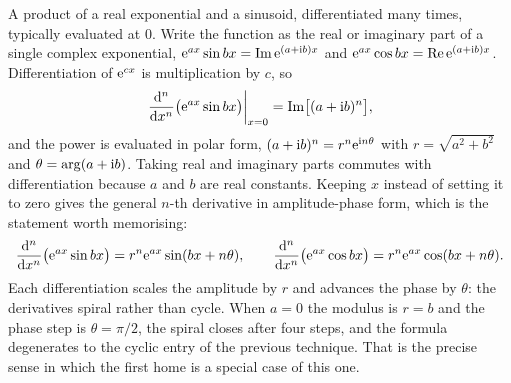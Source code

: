 \cue A product of a real exponential and a sinusoid, differentiated many times, typically evaluated at $0$.
\method Write the function as the real or imaginary part of a single complex exponential, $\mathrm{e}^{ax}\sin bx=\operatorname{Im}\mathrm{e}^{(a+\mathrm{i} b)x}$ and $\mathrm{e}^{ax}\cos bx=\operatorname{Re}\mathrm{e}^{(a+\mathrm{i} b)x}$. Differentiation of $\mathrm{e}^{cx}$ is multiplication by $c$, so
\[
\left.\frac{\mathrm{d}^{n}}{\mathrm{d}x^{n}}\bigl(\mathrm{e}^{ax}\sin bx\bigr)\right|_{x=0}=\operatorname{Im}\bigl[(a+\mathrm{i} b)^{n}\bigr],
\]
and the power is evaluated in polar form, $(a+\mathrm{i} b)^{n}=r^{n}\mathrm{e}^{\mathrm{i} n\theta}$ with $r=\sqrt{a^{2}+b^{2}}$ and $\theta=\arg(a+\mathrm{i} b)$. Taking real and imaginary parts commutes with differentiation because $a$ and $b$ are real constants. Keeping $x$ instead of setting it to zero gives the general $n$-th derivative in amplitude-phase form, which is the statement worth memorising:
\[
\frac{\mathrm{d}^{n}}{\mathrm{d}x^{n}}\bigl(\mathrm{e}^{ax}\sin bx\bigr)=r^{n}\mathrm{e}^{ax}\sin(bx+n\theta),\qquad
\frac{\mathrm{d}^{n}}{\mathrm{d}x^{n}}\bigl(\mathrm{e}^{ax}\cos bx\bigr)=r^{n}\mathrm{e}^{ax}\cos(bx+n\theta).
\]
Each differentiation scales the amplitude by $r$ and advances the phase by $\theta$: the derivatives spiral rather than cycle. When $a=0$ the modulus is $r=b$ and the phase step is $\theta=\pi/2$, the spiral closes after four steps, and the formula degenerates to the cyclic entry of the previous technique. That is the precise sense in which the first home is a special case of this one.

